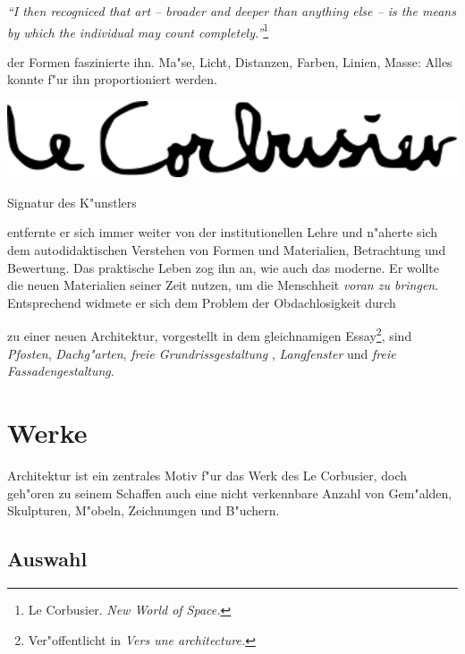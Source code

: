 \documentclass[a4paper]{tufte-handout}
\begin{document}
\emph{"`I then recogniced that art -- broader and deeper than anything else -- is the means by which the individual may count completely."'}\footnote{Le Corbusier. \emph{New World of Space.}}

 der Formen faszinierte ihn. Ma"se, Licht, Distanzen, Farben, Linien, Masse: Alles konnte f"ur ihn proportioniert werden. 

\begin{marginfigure}%
  \includegraphics[width=(\linewidth)]{signature.png}
  \caption{Signatur des K"unstlers}
  \label{fig:signature}
\end{marginfigure}


 entfernte er sich immer weiter von der institutionellen Lehre und n"aherte sich dem autodidaktischen Verstehen von Formen und Materialien, Betrachtung und Bewertung. Das praktische Leben zog ihn an, wie auch das moderne. Er wollte die neuen Materialien seiner Zeit nutzen, um die Menschheit \emph{voran zu bringen}. Entsprechend widmete er sich dem Problem der Obdachlosigkeit durch



 zu einer neuen Architektur, vorgestellt in dem gleichnamigen Essay\footnote{Ver"offentlicht in \emph{Vers une architecture.}}, sind \emph{Pfosten}, \emph{Dachg"arten}, \emph{freie Grundrissgestaltung} , \emph{Langfenster} und \emph{freie Fassadengestaltung}.


\section{Werke}\label{sec:werke}

Architektur ist ein zentrales Motiv f"ur das Werk des Le Corbusier, doch geh"oren zu seinem Schaffen auch eine nicht verkennbare Anzahl von Gem"alden, Skulpturen, M"obeln, Zeichnungen und B"uchern.

\subsection{Auswahl}
\end{document}

